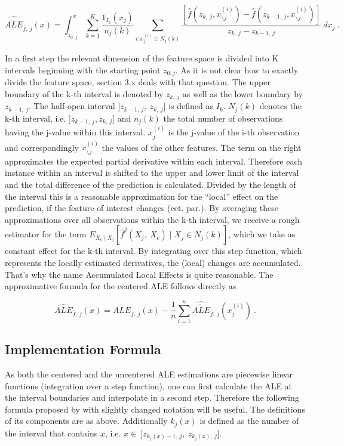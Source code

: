 \documentclass[]{krantz}
\begin{document}
\[ \widehat{\widetilde{ALE}}_{\hat{f},~j}(x) = \int_{z_{0,~j}}^{x} \sum_{k=1}^{K}    \frac{1_{I_k}(x_j)}{n_j(k)}\sum_{i:x_j^{(i)}\in N_j(k)} \frac{[\hat{f}(z_{k,~j}, x_{\setminus j}^{(i)})-\hat{f}(z_{k-1,~j}, x_{\setminus j}^{(i)})]}{z_{k,~j}-z_{k-1,~j}}~dx_j~.  \]

In a first step the relevant dimension of the feature space is divided
into K intervals beginning with the starting point \(z_{0, j}\). As it
is not clear how to exactly divide the feature space, section 3.x deals
with that question. The upper boundary of the k-th interval is denoted
by \(z_{k, ~j}\) as well as the lower boundary by \(z_{k-1, ~j}\). The
half-open interval \(]z_{k-1,~j},~z_{k,~j}]\) is defined as \(I_k\).
\(N_j(k)\) denotes the k-th interval, i.e. \(]z_{k-1,~j}, z_{k,~j}]\)
and \(n_j(k)\) the total number of observations having the j-value
within this interval. \(x_j^{(i)}\) is the j-value of the i-th
observation and correspondingly \(x_{\setminus j}^{(i)}\) the values of
the other features. The term on the right approximates the expected
partial derivative within each interval. Therefore each instance within
an interval is shifted to the upper and lower limit of the interval and
the total difference of the prediction is calculated. Divided by the
length of the interval this is a reasonable approximation for the
``local'' effect on the prediction, if the feature of interest changes
(cet. par.). By averaging these approximations over all observations
within the k-th interval, we receive a rough estimator for the term
\(E_{X_c \mid X_j} [\hat{f}^j(X_j,~X_c)\mid X_j \in N_j(k)]\), which we
take as constant effect for the k-th interval. By integrating over this
step function, which represents the locally estimated derivatives, the
(local) changes are accumulated. That's why the name Accumulated Local
Effects is quite reasonable. The approximative formula for the centered
ALE follows directly as

\[ \widehat{ALE}_{\hat{f},~j}(x) = \widehat{\widetilde{ALE}}_{\hat{f},~j}(x) - \frac{1}{n} \sum_{i=1}^{n} \widehat{\widetilde{ALE}}_{\hat{f},~j}(x_j^{(i)})~. 
 \]

\subsection{Implementation Formula}\label{implementation-formula}

As both the centered and the uncentered ALE estimations are piecewise
linear functions (integration over a step function), one can first
calculate the ALE at the interval boundaries and interpolate in a second
step. Therefore the following formula proposed by \citep[page
11]{Apley2016} with slightly changed notation will be useful. The
definitions of its components are as above. Additionally \(k_j(x)\) is
defined as the number of the interval that contains \(x\), i.e.
\(x \in ~]z_{k_j(x)-1,~j},~z_{k_j(x),~j}]\).
\end{document}

